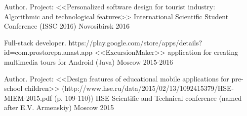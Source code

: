 \begin{cventries}







\cventry
{Author. Project: <<Personalized software design for tourist industry: Algorithmic and technological features>>} %
{International Scientific Student Conference (ISSC 2016)} %
{Novosibirsk} %
{2016} %
{}


\cventry
{Full-stack developer. https://play.google.com/store/apps/details?id=com.prostorepa.anast.app} %
{<<ExcursionMaker>> application for creating multimedia tours for Android  (Java) } %
{Moscow} %
{2015-2016} %
{}

\cventry
{Author. Project: <<Design features of educational mobile applications for pre-school children>> (http://www.hse.ru/data/2015/02/13/1092415379/HSE-MIEM-2015.pdf (p. 109-110))} %
{HSE Scientific and Technical conference (named after E.V. Armenskiy)} %
{Moscow} %
{2015} %
{}


\end{cventries}
